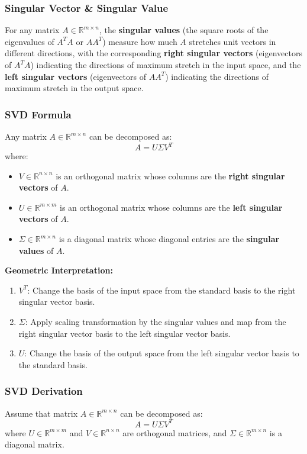 \documentclass{article}
\begin{document}
\subsubsection{Singular Vector \& Singular Value}
For any matrix $A \in \mathbb{R}^{m \times n}$, the \textbf{singular values} (the square roots of the eigenvalues of $A^T A$ or $AA^T$) measure how much $A$ stretches unit vectors in different directions, with the corresponding \textbf{right singular vectors} (eigenvectors of $A^T A$) indicating the directions of maximum stretch in the input space, and the \textbf{left singular vectors} (eigenvectors of $AA^T$) indicating the directions of maximum stretch in the output space.

\subsubsection{SVD Formula}
Any matrix $A \in \mathbb{R}^{m \times n}$ can be decomposed as:
\[
    A = U \Sigma V^T
\]
where:
\begin{itemize}
    \item $V \in \mathbb{R}^{n \times n}$ is an orthogonal matrix whose columns are the \textbf{right singular vectors} of $A$.
    \item $U \in \mathbb{R}^{m \times m}$ is an orthogonal matrix whose columns are the \textbf{left singular vectors} of $A$.
    \item $\Sigma \in \mathbb{R}^{m \times n}$ is a diagonal matrix whose diagonal entries are the \textbf{singular values} of $A$.
\end{itemize}
\textbf{Geometric Interpretation:}
\begin{enumerate}
    \item $V^T$: Change the basis of the input space from the standard basis to the right singular vector basis.
    \item $\Sigma$: Apply scaling transformation by the singular values and map from the right singular vector basis to the left singular vector basis.
    \item $U$: Change the basis of the output space from the left singular vector basis to the standard basis.
\end{enumerate}


\subsubsection{SVD Derivation}
Assume that matrix $A \in \mathbb{R}^{m \times n}$ can be decomposed as:
\[
    A = U \Sigma V^T
\]
where $U \in \mathbb{R}^{m \times m}$ and $V \in \mathbb{R}^{n \times n}$ are orthogonal matrices, and $\Sigma \in \mathbb{R}^{m \times n}$ is a diagonal matrix.
\end{document}
